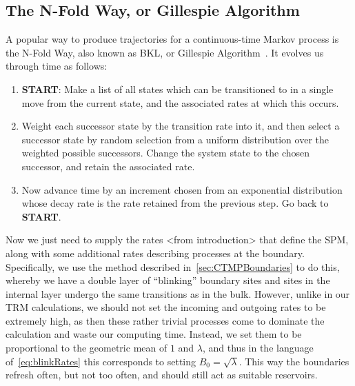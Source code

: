 \subsection{The N-Fold Way, or Gillespie Algorithm}
A popular way to produce trajectories for a continuous-time Markov process is the N-Fold Way, also known as
BKL, or Gillespie Algorithm~\cite{Bortz1975, Prados1997, voterKMC}. It evolves us through time as follows:
\begin{enumerate}
 \item \textbf{START}: Make a list of all states which can be transitioned to in a single move from the 
 current state, and the associated rates at which this occurs.
 \item Weight each successor state by the transition rate into it, and then select a successor state by
 random selection from a uniform distribution over the weighted possible successors. Change the system
 state to the chosen successor, and retain the associated rate. \label{weightingChoose}
 \item Now advance time by an increment chosen from an exponential distribution whose decay rate 
 is the rate retained from the previous step. Go back to \textbf{START}. \label{timestepChoose}
\end{enumerate}
Now we just need to supply the rates <from introduction> that define the SPM, along with some additional rates describing processes at the boundary. Specifically, we use the method described 
in~\ref{sec:CTMPBoundaries} to do this, whereby we have a double layer of ``blinking'' boundary sites
and sites in the internal layer undergo the same transitions as in the bulk. However, unlike in our TRM
calculations, we should not set the incoming and outgoing rates to be extremely high, as then these rather
trivial processes come to dominate the calculation and waste our computing time. Instead, we set them to
be proportional to the geometric mean of $1$ and $\lambda$, and thus in the language of~\ref{eq:blinkRates}
this corresponds to setting $B_0 = \sqrt{\lambda}$. This way the boundaries refresh often, but not too
often, and should still act as suitable reservoirs.

